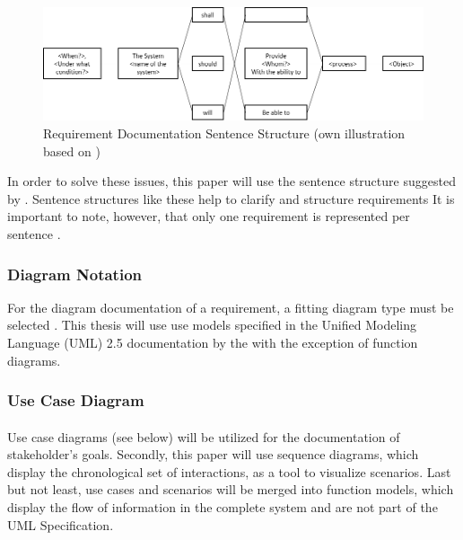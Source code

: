 \paragraph{}
\begin{figure}[H]
    \centering
    \includegraphics[width=\textwidth]{img/SentenceStructure.png}
    \caption{Requirement Documentation Sentence Structure (own illustration based on \cite[246]{Pohl.2007})}
    \label{fig:sentencestructure}
\end{figure}

In order to solve these issues, this paper will use the sentence structure suggested by \textcites[107]{Ebert.2014}[246]{Pohl.2007}. Sentence structures like these help to clarify and structure requirements It is important to note, however, that only one requirement is represented per sentence \parencite[107]{Ebert.2014}. 


\subsubsection{Diagram Notation}
For the diagram documentation of a requirement, a fitting diagram type must be selected \parencite[299]{Pohl.2007}. This thesis will use use models specified in the Unified Modeling Language (UML) 2.5 documentation by the \textcite{ObjectManagementGroup.01.03.2015} with the exception of function diagrams. 


\subsubsection{Use Case Diagram}

\paragraph{\label{par:useCaes}}
Use case diagrams (see below) will be utilized for the documentation of stakeholder's goals. Secondly, this paper will use sequence diagrams, which display the chronological set of interactions, as a tool to visualize scenarios. Last but not least, use cases and scenarios will be merged into function models, which display the flow of information in the complete system and are not part of the UML Specification. 

